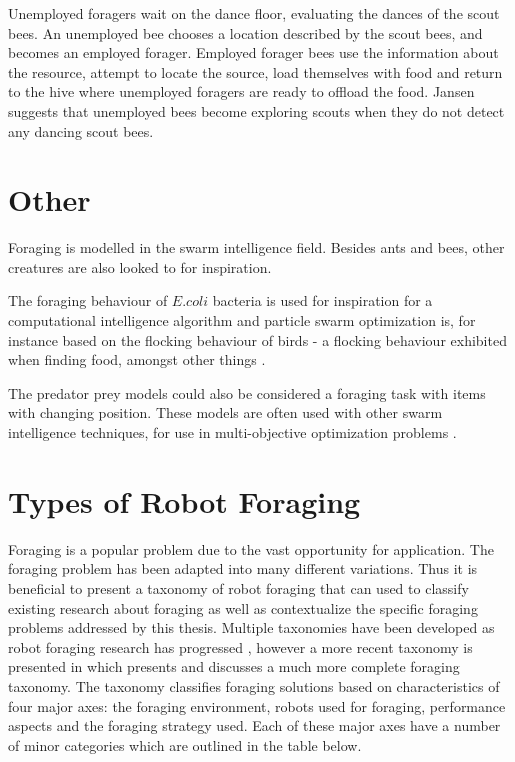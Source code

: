 Unemployed foragers wait on the dance floor, evaluating the dances of the scout bees. An unemployed bee chooses a location described by the scout bees, and becomes an employed forager. Employed forager bees use the information about the resource, attempt to locate the source, load themselves with food and return to the hive where unemployed foragers are ready to offload the food. Jansen \cite{janson2007searching} suggests that unemployed bees become exploring scouts when they do not detect any dancing scout bees. 

\section{Other}
\label{otherforaginginspirations}
Foraging is modelled in the swarm intelligence field. Besides ants and bees, other creatures are also looked to for inspiration.

The foraging behaviour of $E. coli$ bacteria is used for inspiration for a computational intelligence algorithm \cite{passino2010bacterial} and particle swarm optimization is, for instance based on the flocking behaviour of birds - a flocking behaviour exhibited when finding food, amongst other things \cite{kennedy1995particle}. 

The predator prey models could also be considered a foraging task with items with changing position. These models are often used with other swarm intelligence techniques, for use in multi-objective optimization problems \cite{nolfi1998coevolving}.


\section{Types of Robot Foraging}
\label{sec:second:types}

Foraging is a popular problem due to the vast opportunity for application. The foraging problem has been adapted into many different variations. Thus it is beneficial to present a taxonomy of robot foraging that can used to classify existing research about foraging as well as contextualize the specific foraging problems addressed by this thesis. Multiple taxonomies have been developed as robot foraging research has progressed \cite{oster1978caste,ostergaard2001emergent}, however a more recent taxonomy is presented in \cite{winfield2009foraging} which presents and discusses a much more complete foraging taxonomy. The taxonomy classifies foraging solutions based on characteristics of four major axes: the foraging environment, robots used for foraging, performance aspects and the foraging strategy used. Each of these major axes have a number of minor categories which are outlined in the table below.  

